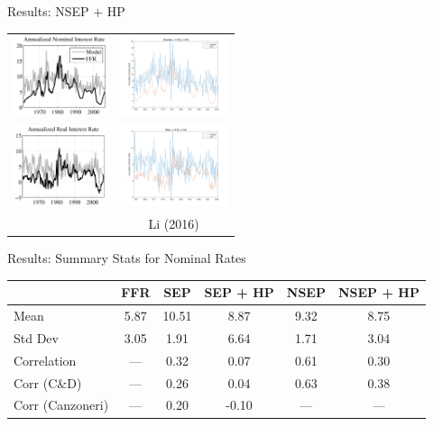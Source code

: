 \documentclass{beamer}
\begin{document}
\begin{frame}{Results: NSEP + HP}
\begin{center}
\begin{tabular}{cc}
\includegraphics[height=90px]{figs/implied_ffr/nominal_4_collard.png} &
\includegraphics[height=90px]{figs/implied_ffr/nominal_4.png} \\
\includegraphics[height=90px]{figs/implied_ffr/real_4_collard.png} &
\includegraphics[height=90px]{figs/implied_ffr/real_4.png} \\
\cite{collard11} & Li (2016)
\end{tabular}
\end{center}
\end{frame}

\begin{frame}{Results: Summary Stats for Nominal Rates}
\begin{center}
\begin{tabular}{|l|c|cccc|} \hline
& FFR & SEP & SEP + HP & NSEP & NSEP + HP \\ \hline
Mean & 5.87 & 10.51 & 8.87 & 9.32 & 8.75 \\
Std Dev & 3.05 & 1.91 & 6.64 & 1.71 & 3.04 \\
Correlation & --- & 0.32 & 0.07 & 0.61 & 0.30 \\ \hline
Corr (C\&D) & --- & 0.26 & 0.04 & 0.63 & 0.38 \\
Corr (Canzoneri) & --- & 0.20 & -0.10 & --- & --- \\ \hline
\end{tabular}
\end{center}
\end{frame}
\end{document}
